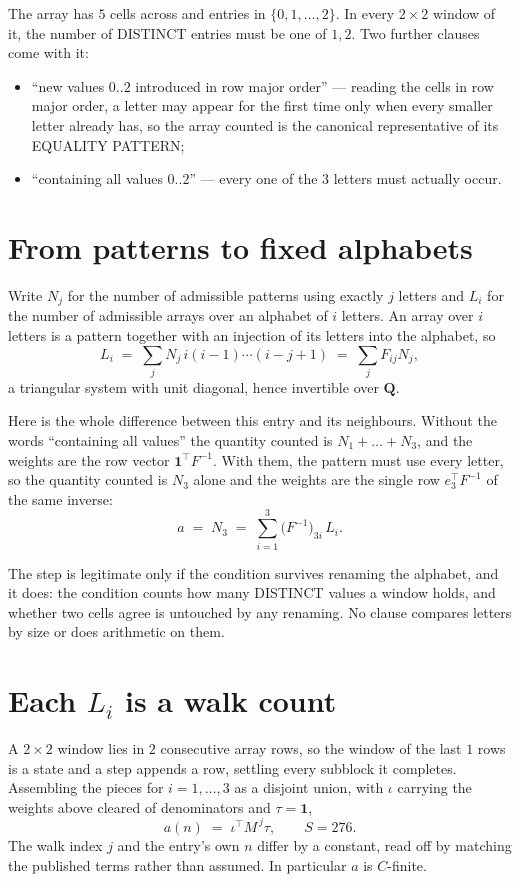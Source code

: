 \documentclass[11pt,a4paper]{article}
\theoremstyle{plain}
\theoremstyle{definition}
\begin{document}
The array has $5$ cells across and entries in $\{0,1,\dots,2\}$. In every
$2\times2$ window of it, the number of DISTINCT entries must be one of $1, 2$. Two
further clauses come with it:

\begin{itemize}
\item ``new values $0..2$ introduced in row major order'' --- reading the cells in row major
order, a letter may appear for the first time only when every smaller letter already has, so
the array counted is the canonical representative of its EQUALITY PATTERN;
\item ``containing all values $0..2$'' --- every one of the $3$ letters must actually
occur.
\end{itemize}


\section{From patterns to fixed alphabets}

Write $N_j$ for the number of admissible patterns using exactly $j$ letters and $L_i$ for the
number of admissible arrays over an alphabet of $i$ letters. An array over $i$ letters is a
pattern together with an injection of its letters into the alphabet, so
\[
L_i\;=\;\sum_{j} N_j\,i(i-1)\cdots(i-j+1)\;=\;\sum_j F_{ij}N_j ,
\]
a triangular system with unit diagonal, hence invertible over $\mathbf{Q}$.

Here is the whole difference between this entry and its neighbours. Without the words
``containing all values'' the quantity counted is $N_1+\dots+N_{3}$, and the weights are
the row vector $\mathbf{1}^{\!\top}F^{-1}$. With them, the pattern must use every letter,
so the quantity counted is $N_{3}$ alone and the weights are the single row
$e_{3}^{\!\top}F^{-1}$ of the same inverse:
\[
a\;=\;N_{3}\;=\;\sum_{i=1}^{3}\bigl(F^{-1}\bigr)_{3i}\,L_i .
\]

The step is legitimate only if the condition survives renaming the alphabet, and it does: the
condition counts how many DISTINCT values a window holds, and whether two cells agree is
untouched by any renaming. No clause compares letters by size or does arithmetic on them.

\section{Each $L_i$ is a walk count}

A $2\times2$ window lies in $2$ consecutive array rows, so the window of the last
$1$ rows is a state and a step appends a row, settling every subblock it completes.
Assembling the pieces for $i=1,\dots,3$ as a disjoint union, with $\iota$ carrying the
weights above cleared of denominators and $\tau=\mathbf{1}$,
\[
a(n)\;=\;\iota^{\!\top}M^{\,j}\tau ,\qquad S=276.
\]
The walk index $j$ and the entry's own $n$ differ by a constant, read off by matching the
published terms rather than assumed. In particular $a$ is $C$-finite.
\end{document}
